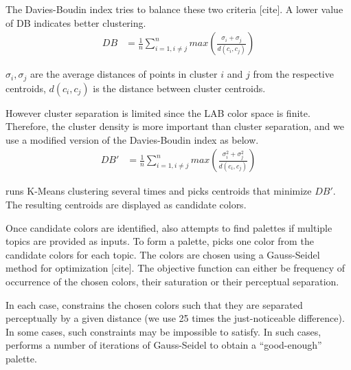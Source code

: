 The Davies-Boudin index tries to balance these two criteria [cite].  A lower value of DB indicates better clustering.
\begin{align}
DB &= \frac{1}{n} \sum_{i=1, i \neq j}^{n}max\left(\frac{\sigma_{i} + \sigma_{j}}{d(c_{i}, c_{j})}\right)
\end{align}

$\sigma_{i}, \sigma_{j}$ are the average distances of points in cluster $i$ and $j$ from the respective centroids, $d(c_{i}, c_{j})$ is the distance between cluster centroids.

However  cluster separation is limited since the LAB color space is finite. Therefore, the cluster density is more important than cluster separation, and we use a modified version of the Davies-Boudin index as below.
\begin{align}
DB' &= \frac{1}{n} \sum_{i=1, i \neq j}^{n}max\left(\frac{\sigma_{i}^{2} + \sigma_{j}^{2}}{d(c_{i}, c_{j})}\right)
\end{align}

\system runs K-Means clustering several times and picks centroids that minimize $DB'$. The resulting centroids are displayed as candidate colors.

Once candidate colors are identified, \system also attempts to find palettes if multiple topics are provided as inputs. To form a palette, \system picks one color from the candidate colors for each topic. The colors are chosen using a Gauss-Seidel method for optimization [cite]. The objective function can either be frequency of occurrence of the chosen colors, their saturation or their perceptual separation. 

In each case, \system constrains the chosen colors such that they are separated perceptually by a given distance (we use 25 times the just-noticeable difference). In some cases, such constraints may be impossible to satisfy. In such cases, \system performs a number of iterations of Gauss-Seidel to obtain a ``good-enough'' palette.